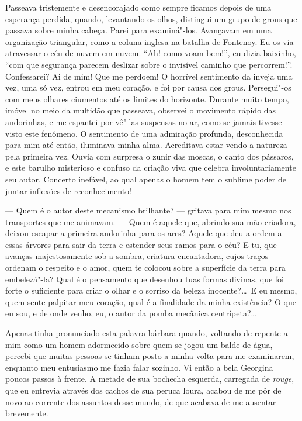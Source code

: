  Passeava tristemente e desencorajado como sempre ficamos depois de uma
esperança perdida, quando, levantando os olhos, distingui um grupo de
grous que passava sobre minha cabeça. Parei para examiná"-los. Avançavam
em uma organização triangular, como a coluna inglesa na batalha de
Fontenoy. Eu os via atravessar o céu de nuvem em nuvem. ``Ah! como voam
bem!'', eu dizia baixinho, ``com que segurança parecem deslizar sobre o
invisível caminho que percorrem!''. Confessarei? Ai de mim! Que me
perdoem! O horrível sentimento da inveja uma vez, uma só vez, entrou em
meu coração, e foi por causa dos grous. Persegui"-os com meus olhares
ciumentos até os limites do horizonte. Durante muito tempo, imóvel no
meio da multidão que passeava, observei o movimento rápido das
andorinhas, e me espantei por vê"-las suspensas no ar, como se jamais
tivesse visto este fenômeno. O sentimento de uma admiração profunda,
desconhecida para mim até então, iluminava minha alma. Acreditava estar
vendo a natureza pela primeira vez. Ouvia com surpresa o zunir das
moscas, o canto dos pássaros, e este barulho misterioso e confuso da
criação viva que celebra involuntariamente seu autor. Concerto
inefável, ao qual apenas o homem tem o sublime poder de juntar
inflexões de reconhecimento! 

--- Quem é o autor deste mecanismo brilhante? --- gritava para mim mesmo
nos transportes que me animavam. --- Quem é aquele que, abrindo sua mão
criadora, deixou escapar a primeira andorinha para os ares? Aquele que
deu a ordem a essas árvores para sair da terra e estender seus ramos
para o céu? E tu, que avanças majestosamente sob a sombra, criatura
encantadora, cujos traços ordenam o respeito e o amor, quem te colocou
sobre a superfície da terra para embelezá"-la? Qual é o pensamento que
desenhou tuas formas divinas, que foi forte o suficiente para criar o
olhar e o sorriso da beleza inocente?\ldots\ E eu mesmo, quem sente
palpitar meu coração, qual é a finalidade da minha existência? O que eu
sou, e de onde venho, eu, o autor da pomba mecânica centrípeta?\ldots

 Apenas tinha pronunciado esta palavra bárbara quando, voltando de
repente a mim como um homem adormecido sobre quem se jogou um balde de
água, percebi que muitas pessoas se tinham posto a minha volta para me
examinarem, enquanto meu entusiasmo me fazia falar sozinho. Vi então a
bela Georgina poucos passos à frente. A metade de sua bochecha
esquerda, carregada de \textit{rouge}, que eu entrevia através dos
cachos de sua peruca loura, acabou de me pôr de novo ao corrente dos
assuntos desse mundo, de que acabava de me ausentar brevemente.

